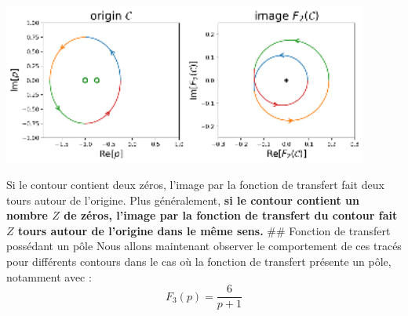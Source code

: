 \begin{center}
    \includegraphics[width=0.9\textwidth]{notebook/fig/output_29_1.eps}
\end{center}
Si le contour contient deux zéros, l'image par la fonction de transfert
fait deux tours autour de l'origine. Plus généralement, \textbf{si le
contour contient un nombre \(Z\) de zéros, l'image par la fonction de
transfert du contour fait \(Z\) tours autour de l'origine dans le même
sens.} \#\# Fonction de transfert possédant un pôle Nous allons
maintenant observer le comportement de ces tracés pour différents
contours dans le cas où la fonction de transfert présente un pôle,
notamment avec :
\[
F_3(p)=\dfrac{6}{p+1}
\] 
